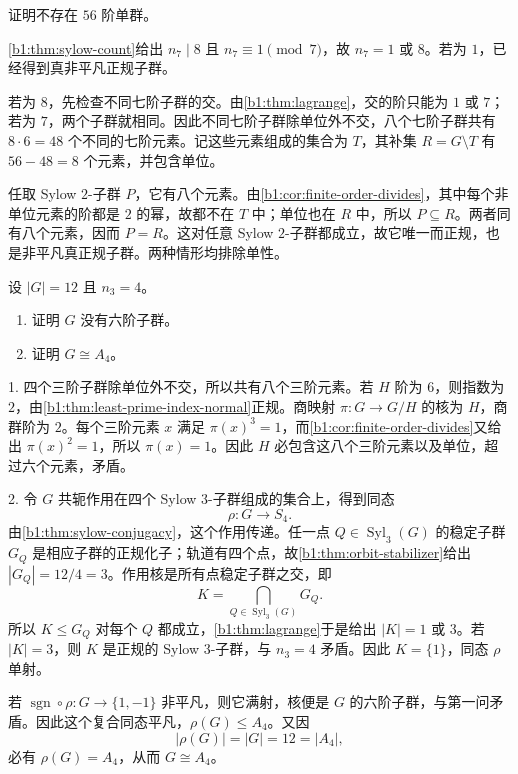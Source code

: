 \begin{exercise}\label{b1:ex:05-3}
	证明不存在 \(56\) 阶单群。
\end{exercise}
\begin{solution}
	\cref{b1:thm:sylow-count}给出 \(n_7\mid8\) 且 \(n_7\equiv1\pmod7\)，故 \(n_7=1\) 或 \(8\)。若为 \(1\)，已经得到真非平凡正规子群。

	若为 \(8\)，先检查不同七阶子群的交。由\cref{b1:thm:lagrange}，交的阶只能为 \(1\) 或 \(7\)；若为 \(7\)，两个子群就相同。因此不同七阶子群除单位外不交，八个七阶子群共有 \(8\cdot6=48\) 个不同的七阶元素。记这些元素组成的集合为 \(T\)，其补集 \(R=G\setminus T\) 有 \(56-48=8\) 个元素，并包含单位。

	任取 Sylow \(2\)-子群 \(P\)，它有八个元素。由\cref{b1:cor:finite-order-divides}，其中每个非单位元素的阶都是 \(2\) 的幂，故都不在 \(T\) 中；单位也在 \(R\) 中，所以 \(P\subseteq R\)。两者同有八个元素，因而 \(P=R\)。这对任意 Sylow \(2\)-子群都成立，故它唯一而正规，也是非平凡真正规子群。两种情形均排除单性。
\end{solution}

\begin{exercise}\label{b1:ex:05-4}
	设 \(|G|=12\) 且 \(n_3=4\)。
	\begin{enumerate}
		\item 证明 \(G\) 没有六阶子群。
		\item 证明 \(G\cong A_4\)。
	\end{enumerate}
\end{exercise}
\begin{solution}
	1. 四个三阶子群除单位外不交，所以共有八个三阶元素。若 \(H\) 阶为 \(6\)，则指数为 \(2\)，由\cref{b1:thm:least-prime-index-normal}正规。商映射 \(\pi:G\rightarrow G/H\) 的核为 \(H\)，商群阶为 \(2\)。每个三阶元素 \(x\) 满足 \(\pi(x)^3=1\)，而\cref{b1:cor:finite-order-divides}又给出 \(\pi(x)^2=1\)，所以 \(\pi(x)=1\)。因此 \(H\) 必包含这八个三阶元素以及单位，超过六个元素，矛盾。

	2. 令 \(G\) 共轭作用在四个 Sylow \(3\)-子群组成的集合上，得到同态
	\[
		\rho:G\longrightarrow S_4.
	\]
	由\cref{b1:thm:sylow-conjugacy}，这个作用传递。任一点 \(Q\in\operatorname{Syl}_3(G)\) 的稳定子群 \(G_Q\) 是相应子群的正规化子；轨道有四个点，故\cref{b1:thm:orbit-stabilizer}给出 \(|G_Q|=12/4=3\)。作用核是所有点稳定子群之交，即
	\[
		K=\bigcap_{Q\in\operatorname{Syl}_3(G)}G_Q.
	\]
	所以 \(K\leq G_Q\) 对每个 \(Q\) 都成立，\cref{b1:thm:lagrange}于是给出 \(|K|=1\) 或 \(3\)。若 \(|K|=3\)，则 \(K\) 是正规的 Sylow \(3\)-子群，与 \(n_3=4\) 矛盾。因此 \(K=\{1\}\)，同态 \(\rho\) 单射。

	若 \(\operatorname{sgn}\circ\rho:G\rightarrow\{1,-1\}\) 非平凡，则它满射，核便是 \(G\) 的六阶子群，与第一问矛盾。因此这个复合同态平凡，\(\rho(G)\leq A_4\)。又因
	\[
		|\rho(G)|=|G|=12=|A_4|,
	\]
	必有 \(\rho(G)=A_4\)，从而 \(G\cong A_4\)。
\end{solution}

